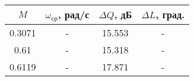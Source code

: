 \begin{tabular}{|c|c|c|c|}
\hline
   $M$ & $\omega_{ср}$, рад/с &  $\Delta Q$, дБ & $\Delta L$, град. \\
\hline
0.3071 &                    - &          15.553 &                 - \\
  0.61 &                    - &          15.318 &                 - \\
0.6119 &                    - &          17.871 &                 - \\
\hline
\end{tabular}
